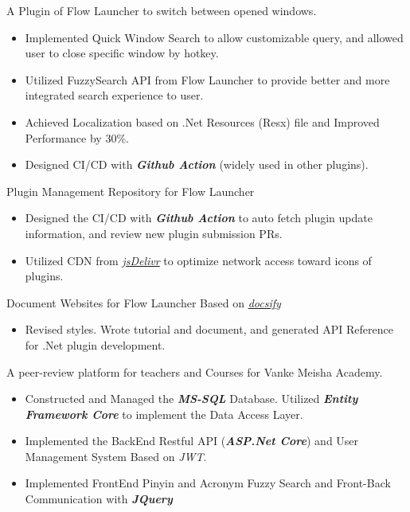\documentclass{resume}
\begin{document}
A Plugin of Flow Launcher to switch between opened windows.
\begin{itemize}
  \item Implemented Quick Window Search to allow customizable query, and allowed user to close specific window by hotkey.
  \item Utilized FuzzySearch API from Flow Launcher to provide better and more integrated search experience to user.
  \item Achieved Localization based on .Net Resources (Resx) file and Improved Performance by 30\%.
  \item Designed CI/CD with \textbf{\textit{Github Action}} (widely used in other plugins).
\end{itemize}

Plugin Management Repository for Flow Launcher
\begin{itemize}
  \item Designed the CI/CD with \textbf{\textit{Github Action}} to auto fetch plugin update information, and review new plugin submission PRs.
  \item Utilized CDN from \href{https://www.jsdelivr.com/}{\textit{jsDelivr}} to optimize network access toward icons of plugins.
\end{itemize}

Document Websites for Flow Launcher Based on \href{https://docsify.js.org/#/}{\textit{docsify}}
\begin{itemize}
  \item Revised styles. Wrote tutorial and document, and generated API Reference for .Net plugin development.
\end{itemize}

A peer-review platform for teachers and Courses for Vanke Meisha Academy.
\begin{itemize}
  \item Constructed and Managed the \textbf{\textit{MS-SQL}} Database. Utilized \textbf{\textit{Entity Framework Core}} to implement the Data Access Layer.
  \item Implemented the BackEnd Restful API (\textbf{\textit{ASP.Net Core}}) and User Management System Based on \textit{JWT}.
  \item Implemented FrontEnd Pinyin and Acronym Fuzzy Search and Front-Back Communication with \textbf{\textit{JQuery}}
\end{itemize}
\end{document}
